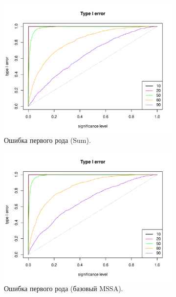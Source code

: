 \documentclass[specialist,
substylefile = spbu_report.rtx,
subf,href,colorlinks=true, 12pt]{disser}
\theoremstyle{definition}
\begin{document}
	\begin{figure}
		\captionsetup[subfigure]{justification=Centering}
		\begin{subfigure}[t]{0.45\textwidth}
			\centering
			\includegraphics[width=\textwidth]{type1error_sum_fa.pdf}
			\caption{Ошибка первого рода (Sum).}
		\end{subfigure}\hspace{\fill}
		\begin{subfigure}[t]{0.45\textwidth}
			\centering
			\includegraphics[width=\textwidth]{type1error_mssa_fa.pdf}
			\caption{Ошибка первого рода (базовый MSSA).}
		\end{subfigure}
		\bigskip
		\begin{subfigure}[t]{0.45\textwidth}

\end{subfigure}
\end{figure}
\end{document}
